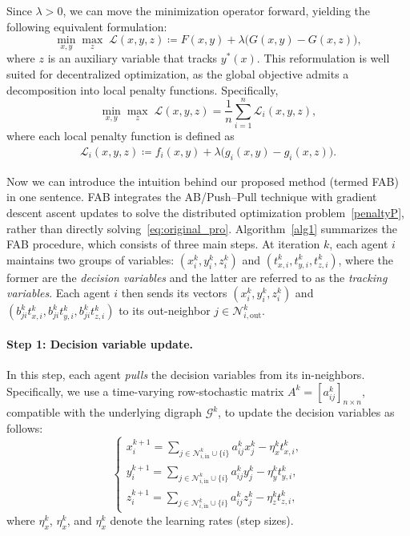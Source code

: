 \documentclass{article}
\theoremstyle{plain}
\theoremstyle{definition}
\theoremstyle{remark}
\begin{document}
Since $\lambda>0$, we can move the minimization operator forward, yielding the following equivalent formulation:
\begin{equation*}
    \min_{x, y} \max_{z} \; \mathcal{L}(x, y, z) \coloneqq F(x, y) + \lambda \big( G(x, y) - G(x, z) \big),
\end{equation*}
where $z$ is an auxiliary variable that tracks $y^{*}(x)$. 
This reformulation is well suited for decentralized optimization, as the global objective admits a decomposition into local penalty functions. Specifically,  
    \begin{equation}\label{penaltyP}
        \min_{x, y} \max_{z} \; \mathcal{L}(x, y, z) = \frac{1}{n}\sum_{i=1}^{n}\mathcal{L}_{i}(x, y, z),
    \end{equation}
where each local penalty function is defined as 
    \begin{align}\label{localpenalty}
        \mathcal{L}_{i}(x, y, z) \coloneqq f_{i}(x, y) + \lambda \big( g_{i}(x, y) - g_{i}(x, z) \big).
    \end{align}

Now we can introduce the intuition behind our proposed method (termed FAB) in one sentence. 
FAB integrates the AB/Push–Pull technique with gradient descent ascent updates to solve the distributed optimization problem~\eqref{penaltyP}, rather than directly solving~\eqref{eq:original_pro}.  
Algorithm~\ref{alg1} summarizes the FAB procedure, which consists of three main steps. At iteration $k$, each agent $i$ maintains two groups of variables: $(x_{i}^{k}, y_{i}^{k}, z_{i}^{k})$ and $(t_{x, i}^k, t_{y, i}^k, t_{z, i}^k)$, where the former are the \textit{decision variables} and the latter are referred to as the \textit{tracking variables}. 
Each agent $i$ then sends its vectors $(x_{i}^{k}, y_{i}^{k}, z_{i}^{k})$ and $(b_{ji}^{k} t_{x, i}^k, b_{ji}^{k} t_{y, i}^k, b_{ji}^{k} t_{z, i}^k)$ to its out-neighbor $j\in \mathcal{N}_{i,\mathrm{out}}^{k}$.

\paragraph{Step 1: Decision variable update.} 
In this step, each agent \textit{pulls} the decision variables from its in-neighbors. Specifically, we use a time-varying row-stochastic matrix $A^{k}=[a_{ij}^{k}]_{n\times n}$, compatible with the underlying digraph $\mathcal{G}^{k}$, to update the decision variables as follows:
\begin{equation}\label{state_v_update}
\begin{cases}
    x_{i}^{k+1} = \sum_{j\in\mathcal{N}_{i,\mathrm{in}}^{k}\cup\{i\}}a_{ij}^{k} x_{j}^{k} - \eta_{x}^{k}t_{x, i}^k, \\
    y_{i}^{k+1} = \sum_{j\in\mathcal{N}_{i,\mathrm{in}}^{k}\cup\{i\}}a_{ij}^{k} y_{j}^{k} - \eta_{y}^{k}t_{y, i}^k, \\
    z_{i}^{k+1} = \sum_{j\in\mathcal{N}_{i,\mathrm{in}}^{k}\cup\{i\}}a_{ij}^{k} z_{j}^{k} - \eta_{z}^{k}t_{z, i}^k,
\end{cases}
\end{equation}
where $\eta_{x}^{k}$, $\eta_{x}^{k}$, and $\eta_{x}^{k}$ denote the learning rates (step sizes).
\end{document}

